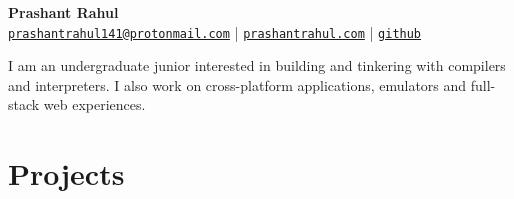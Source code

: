 \documentclass[a4paper,11pt]{article}
\begin{document}
\begin{center}
    {\huge \textbf{Prashant Rahul}} \\
    {\footnotesize \texttt{\href{mailto:prashantrahul141@protonmail.com}{prashantrahul141@protonmail.com}} |
    \texttt{\href{https://prashantrahul.com}{prashantrahul.com}} |
    \texttt{\href{https://github.com/prashantrahul141}{github}}} \\
\end{center}

\noindent
I am an undergraduate junior interested in building and tinkering with compilers and interpreters. I also work on cross-platform applications, emulators and full-stack web experiences.

\section*{Projects}
\end{document}
